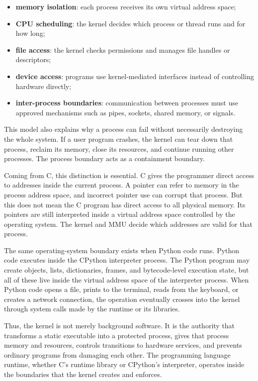\begin{itemize}
    \item \textbf{memory isolation}: each process receives its own virtual address space;
    \item \textbf{CPU scheduling}: the kernel decides which process or thread runs and for how long;
    \item \textbf{file access}: the kernel checks permissions and manages file handles or descriptors;
    \item \textbf{device access}: programs use kernel-mediated interfaces instead of controlling hardware directly;
    \item \textbf{inter-process boundaries}: communication between processes must use approved mechanisms such as pipes, sockets, shared memory, or signals.
\end{itemize}

This model also explains why a process can fail without necessarily destroying the whole system. If a user program crashes, the kernel can tear down that process, reclaim its memory, close its resources, and continue running other processes. The process boundary acts as a containment boundary.

Coming from C, this distinction is essential. C gives the programmer direct access to addresses inside the current process. A pointer can refer to memory in the process address space, and incorrect pointer use can corrupt that process. But this does not mean the C program has direct access to all physical memory. Its pointers are still interpreted inside a virtual address space controlled by the operating system. The kernel and MMU decide which addresses are valid for that process.

The same operating-system boundary exists when Python code runs. Python code executes inside the CPython interpreter process. The Python program may create objects, lists, dictionaries, frames, and bytecode-level execution state, but all of these live inside the virtual address space of the interpreter process. When Python code opens a file, prints to the terminal, reads from the keyboard, or creates a network connection, the operation eventually crosses into the kernel through system calls made by the runtime or its libraries.

Thus, the kernel is not merely background software. It is the authority that transforms a static executable into a protected process, gives that process memory and resources, controls transitions to hardware services, and prevents ordinary programs from damaging each other. The programming language runtime, whether C's runtime library or CPython's interpreter, operates inside the boundaries that the kernel creates and enforces.